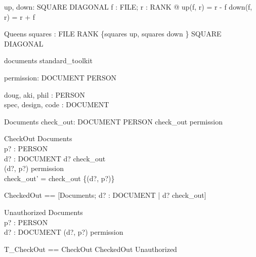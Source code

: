 \documentclass{llncs}
\begin{document}
\begin{axdef}
up, down: SQUARE \fun DIAGONAL
\where \forall f : FILE; r : RANK @ up(f, r) = r - f \land down(f, r)
= r + f
\end{axdef}

\begin{schema}{Queens}
squares : FILE \bij RANK 
\where \{squares \dres up, squares \dres down \} \subseteq SQUARE
\inj DIAGONAL
\end{schema}



\begin{zsection}
\SECTION documents \parents standard\_toolkit
\end{zsection}

\begin{zed}
\end{zed}

\begin{axdef}
permission: DOCUMENT \rel PERSON
\end{axdef}

\begin{axdef}
doug, aki, phil : PERSON \\
spec, design, code : DOCUMENT
\end{axdef}

\begin{schema}{Documents}
check\_out: DOCUMENT \pfun PERSON
\where
check\_out \subseteq permission
\end{schema}

\begin{schema}{CheckOut}
\Delta Documents \\
p? : PERSON \\
d? : DOCUMENT
\where
d? \notin \dom check\_out \\
(d?, p?) \in permission \\
check\_out' = check\_out \cup \{(d?, p?)\}
\end{schema}

\begin{zed}
CheckedOut == [\Xi Documents; d? : DOCUMENT | d? \in \dom
check\_out]
\end{zed}

\begin{schema}{Unauthorized}
\Xi Documents \\
p? : PERSON \\
d? : DOCUMENT 
\where (d?, p?) \notin permission
\end{schema}

\begin{zed}
T\_CheckOut == CheckOut \lor CheckedOut \lor Unauthorized
\end{zed}
\end{document}
